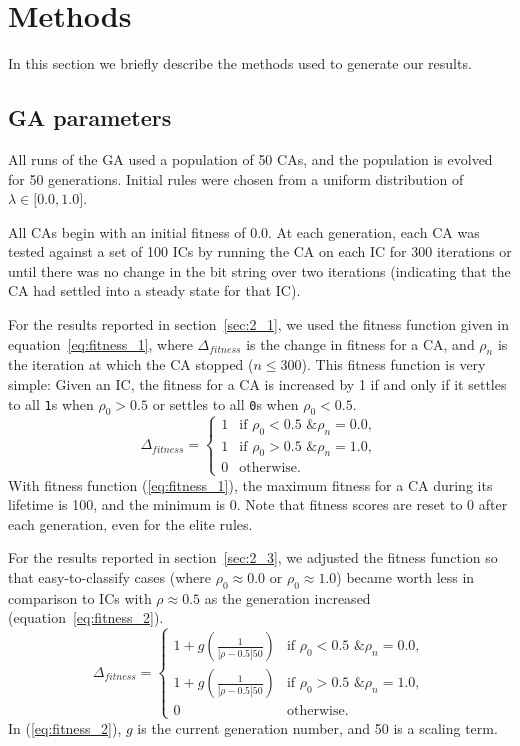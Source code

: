 
\section{Methods} \label{sec:methods}

In this section we briefly describe the methods used to generate our results.

\subsection{GA parameters}

All runs of the GA used a population of 50 CAs, and the population is evolved for 50 generations. 
Initial rules were chosen from a uniform distribution of $\lambda \in \lbrack0.0, 1.0\rbrack$.

All CAs begin with an initial fitness of 0.0. At each generation, each CA was tested against a set of 100 ICs by 
running the CA on each IC for 300 iterations or until there was no change in the bit string over two iterations (indicating that 
the CA had settled into a steady state for that IC). 

For the results reported in section~\ref{sec:2_1}, we used the fitness function given in equation~\ref{eq:fitness_1}, where 
$\Delta_{fitness}$ is the change in fitness for a CA, and $\rho_n$ is the iteration at which the CA stopped ($n \leq 300$). This fitness 
function is very simple: Given an IC, the fitness for a CA is increased by 1 if and only if it settles to all \texttt{1}s when $\rho_0 > 0.5$ or 
settles to all \texttt{0}s when $\rho_0 < 0.5$.
\begin{equation} \label{eq:fitness_1}
  \Delta_{fitness} =
  \begin{cases}
    1 & \text{if } \rho_0 < 0.5 \text{ \& } \rho_n = 0.0,
    \\
    1 & \text{if } \rho_0 > 0.5 \text{ \& } \rho_n = 1.0,
   \\
    0 & \text{otherwise}.
  \end{cases}
\end{equation}
With fitness function (\ref{eq:fitness_1}), the maximum fitness for a CA during its lifetime is 100, and the minimum is 0. Note that fitness 
scores are reset to 0 after each generation, even for the elite rules.

For the results reported in section~\ref{sec:2_3}, we adjusted the fitness function so that easy-to-classify cases (where 
$\rho_0 \approx 0.0$ or $\rho_0 \approx 1.0$) became worth less in comparison to ICs with $\rho \approx 0.5$ as the generation 
increased (equation~\ref{eq:fitness_2}).
\begin{equation} \label{eq:fitness_2}
  \Delta_{fitness} =
  \begin{cases}
    1 + g\left(\frac{1}{|\rho - 0.5| 50}\right) & \text{if } \rho_0 < 0.5 \text{ \& } \rho_n = 0.0,
    \\
    1 + g\left(\frac{1}{|\rho - 0.5| 50}\right)& \text{if } \rho_0 > 0.5 \text{ \& } \rho_n = 1.0,
   \\
    0 & \text{otherwise}.
  \end{cases}
\end{equation}
In (\ref{eq:fitness_2}), $g$ is the current generation number, and 50 is a scaling term.


